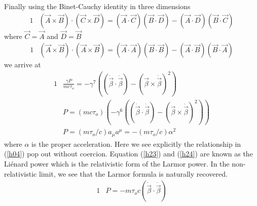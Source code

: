 \documentclass[]{article}
\numberwithin{equation}{subsection}
\begin{document}
Finally using the Binet-Cauchy identity in three dimensions
	\begin{alignat}{1}
	\label{hh03}		&(\vec{A}\times\vec{B})\cdot(\vec{C}\times\vec{D})=(\vec{A}\cdot\vec{C})(\vec{B}\cdot\vec{D})-(\vec{A}\cdot\vec{D})(\vec{B}\cdot\vec{C})
	\end{alignat}
where $\vec{C}=\vec{A}$ and $\vec{D}=\vec{B}$
	\begin{alignat}{1}
	\label{hh04}		&(\vec{A}\times\vec{B})\cdot(\vec{A}\times\vec{B})=(\vec{A}\cdot\vec{A})(\vec{B}\cdot\vec{B})-(\vec{A}\cdot\vec{B})(\vec{B}\cdot\vec{A})
	\end{alignat}
we arrive at
	\begin{alignat}{1}
	\label{h22}		&\frac{\gamma P}{mc\tau_{o}}=-\gamma^{7}((\dot{\vec{\beta}}\cdot\dot{\vec{\beta}})-(\vec{\beta}\times\dot{\vec{\beta}})^{2})\\
	\label{h23}		&P=(mc\tau_{o})(-\gamma^{6}((\dot{\vec{\beta}}\cdot\dot{\vec{\beta}})-(\vec{\beta}\times\dot{\vec{\beta}})^{2}))\\
	\label{h24}		&P=(m\tau_{o}/c)a_{\mu}a^{\mu}=-(m\tau_{o}/c)\alpha^{2}
	\end{alignat}
where $\alpha$ is the proper acceleration. Here we see explicitly the relationship in (\ref{h04}) pop out without coercion. Equation (\ref{h23}) and (\ref{h24}) are known as the Li\'enard power which is the relativistic form of the Larmor power. In the non-relativistic limit, we see that the Larmor formula is naturally recovered.
	\begin{alignat}{1}
	\label{h26}		&P=-m\tau_{o}c(\dot{\vec{\beta}}\cdot\dot{\vec{\beta}})
	\end{alignat}
\end{document}
